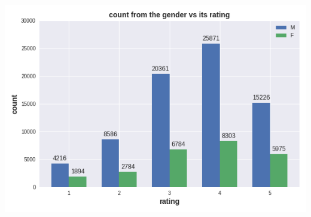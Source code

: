 \documentclass[11pt,a4paper]{article}
\begin{document}
\begin{minipage}[t]{0.38\textwidth}
	\includegraphics[width=\textwidth]{Bilder/sex_dist_rating.png}
\end{minipage}
\end{document}
